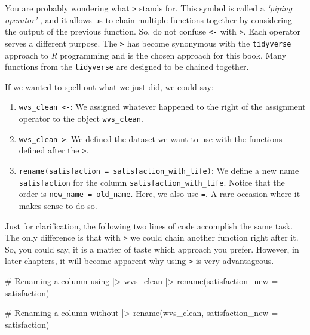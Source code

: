 \documentclass[
  letterpaper,
]{krantz}
\makeatletter
\newenvironment{Shaded}{\begin{snugshade}}{\end{snugshade}}
\newcommand{\AttributeTok}[1]{\textcolor[rgb]{0.40,0.45,0.13}{#1}}
\newcommand{\CommentTok}[1]{\textcolor[rgb]{0.37,0.37,0.37}{#1}}
\newcommand{\FunctionTok}[1]{\textcolor[rgb]{0.28,0.35,0.67}{#1}}
\newcommand{\NormalTok}[1]{\textcolor[rgb]{0.00,0.23,0.31}{#1}}
\newcommand{\SpecialCharTok}[1]{\textcolor[rgb]{0.37,0.37,0.37}{#1}}
\newenvironment{kframe}{%
\medskip{}
\setlength{\fboxsep}{.8em}
 \def\at@end@of@kframe{}%
 \ifinner\ifhmode%
  \def\at@end@of@kframe{\end{minipage}}%
  \begin{minipage}{\columnwidth}%
 \fi\fi%
 \def\FrameCommand##1{\hskip\@totalleftmargin \hskip-\fboxsep
 \colorbox{shadecolor}{##1}\hskip-\fboxsep
     \hskip-\linewidth \hskip-\@totalleftmargin \hskip\columnwidth}%
 \MakeFramed {\advance\hsize-\width
   \@totalleftmargin\z@ \linewidth\hsize
   \@setminipage}}%
 {\par\unskip\endMakeFramed%
 \at@end@of@kframe}
\renewenvironment{Shaded}{\begin{kframe}}{\end{kframe}}
\makeatother
\begin{document}
You are probably wondering what \texttt{\textbar{}\textgreater{}} stands
for. This symbol is called a \emph{`piping operator'} , and it allows us
to chain multiple functions together by considering the output of the
previous function. So, do not confuse \texttt{\textless{}-} with
\texttt{\textbar{}\textgreater{}}. Each operator serves a different
purpose. The \texttt{\textbar{}\textgreater{}} has become synonymous
with the \texttt{tidyverse} approach to \emph{R} programming and is the
chosen approach for this book. Many functions from the
\texttt{tidyverse} are designed to be chained together.

If we wanted to spell out what we just did, we could say:

\begin{enumerate}
\def\labelenumi{\arabic{enumi}.}
\item
  \texttt{wvs\_clean\ \textless{}-}: We assigned whatever happened to
  the right of the assignment operator to the object
  \texttt{wvs\_clean}.
\item
  \texttt{wvs\_clean\ \textbar{}\textgreater{}}: We defined the dataset
  we want to use with the functions defined after the
  \texttt{\textbar{}\textgreater{}}.
\item
  \texttt{rename(satisfaction\ =\ satisfaction\_with\_life)}: We define
  a new name \texttt{satisfaction} for the column
  \texttt{satisfaction\_with\_life}. Notice that the order is
  \texttt{new\_name\ =\ old\_name}. Here, we also use \texttt{=}. A rare
  occasion where it makes sense to do so.
\end{enumerate}

Just for clarification, the following two lines of code accomplish the
same task. The only difference is that with
\texttt{\textbar{}\textgreater{}} we could chain another function right
after it. So, you could say, it is a matter of taste which approach you
prefer. However, in later chapters, it will become apparent why using
\texttt{\textbar{}\textgreater{}} is very advantageous.

\begin{Shaded}
\begin{Highlighting}[]
\CommentTok{\# Renaming a column using \textquotesingle{}|\textgreater{}\textquotesingle{}}
\NormalTok{wvs\_clean }\SpecialCharTok{|\textgreater{}} \FunctionTok{rename}\NormalTok{(}\AttributeTok{satisfaction\_new =}\NormalTok{ satisfaction)}

\CommentTok{\# Renaming a column without \textquotesingle{}|\textgreater{}\textquotesingle{}}
\FunctionTok{rename}\NormalTok{(wvs\_clean, }\AttributeTok{satisfaction\_new =}\NormalTok{ satisfaction)}
\end{Highlighting}
\end{Shaded}
\end{document}
